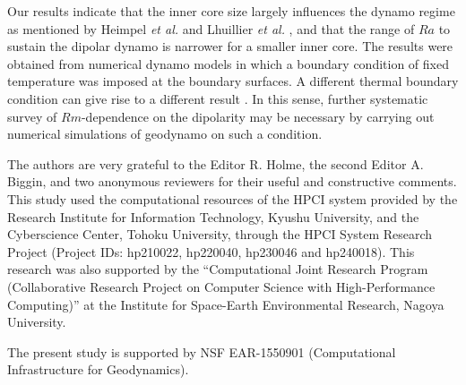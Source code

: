 Our results indicate that the inner core size largely influences the dynamo regime as mentioned by Heimpel {\it et al.}  and Lhuillier {\it et al.} , and that the range of $Ra$ to sustain the dipolar dynamo is narrower for a smaller inner core.
The results were obtained from numerical dynamo models in which a boundary condition of fixed temperature was imposed at the boundary surfaces.
A different thermal boundary condition can give rise to a different result
{\color{red}
\cite{Sakuraba:2009,Hori:2010}.
In this sense, further systematic survey of $Rm$-dependence on the dipolarity may be necessary by carrying out numerical simulations of geodynamo on such a condition.
}


\begin{acknowledgments}
{\color{red}
The authors are very grateful to the Editor R. Holme, the second Editor A. Biggin, and two anonymous reviewers for their useful and constructive comments.
}
This study used the computational resources of the HPCI system provided by the Research Institute for Information Technology, Kyushu University, and the Cyberscience Center, Tohoku University, through the HPCI System Research Project (Project IDs: hp210022, hp220040, hp230046 and hp240018). This research was also supported by the “Computational Joint Research Program (Collaborative Research Project on Computer Science with High-Performance Computing)” at the Institute for Space-Earth Environmental Research, Nagoya University.

The present study is supported by NSF EAR-1550901 (Computational Infrastructure for Geodynamics).
\end{acknowledgments}




